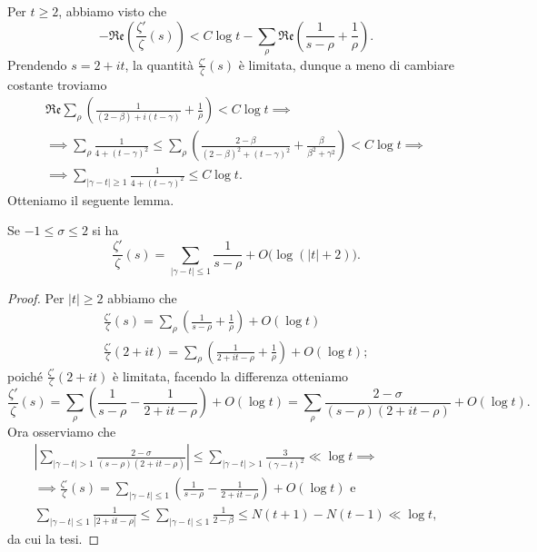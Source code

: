 Per $t \ge 2$, abbiamo visto che
$$-\mathfrak{Re}\left(\frac{\zeta'}{\zeta}(s)\right)<C\log{t}-\sum_{\rho} \mathfrak{Re}\left(\frac{1}{s-\rho}+\frac{1}{\rho}\right).$$
Prendendo $s=2+it$, la quantità $\frac{\zeta'}{\zeta}(s)$ è limitata, dunque a meno di cambiare costante troviamo
\begin{gather*}
  \mathfrak{Re}\sum_{\rho}\left(\frac{1}{(2-\beta)+i(t-\gamma)}+\frac{1}{\rho}\right)<C\log{t} \implies \\
  \implies \sum_{\rho} \frac{1}{4+(t-\gamma)^2} \le \sum_{\rho} \left(\frac{2-\beta}{(2-\beta)^2+(t-\gamma)^2}+\frac{\beta}{\beta^2+\gamma^2}\right)<C\log{t} \implies \\
  \implies \sum_{|\gamma-t| \ge 1} \frac{1}{4+(t-\gamma)^2} \le C\log{t}.
\end{gather*}
Otteniamo il seguente lemma.

\begin{lm}
  Se $-1 \le \sigma \le 2$ si ha
  $$\frac{\zeta'}{\zeta}(s)=\sum_{|\gamma-t| \le 1} \frac{1}{s-\rho}+O\big(\log(|t|+2)\big).$$
\end{lm}

\begin{proof}
  Per $|t| \ge 2$ abbiamo che
  \begin{gather*}
    \frac{\zeta'}{\zeta}(s)=\sum_{\rho} \left(\frac{1}{s-\rho}+\frac{1}{\rho}\right)+O(\log{t}) \\
    \frac{\zeta'}{\zeta}(2+it)=\sum_{\rho}\left(\frac{1}{2+it-\rho}+\frac{1}{\rho}\right)+O(\log{t});
  \end{gather*}
  poiché $\frac{\zeta'}{\zeta}(2+it)$ è limitata, facendo la differenza otteniamo
  $$\frac{\zeta'}{\zeta}(s)=\sum_{\rho} \left(\frac{1}{s-\rho}-\frac{1}{2+it-\rho}\right)+O(\log{t})=\sum_{\rho} \frac{2-\sigma}{(s-\rho)(2+it-\rho)}+O(\log{t}).$$
  Ora osserviamo che
  \begin{gather*}
    \left| \sum_{|\gamma-t|>1} \frac{2-\sigma}{(s-\rho)(2+it-\rho)}\right| \le \sum_{|\gamma-t|>1} \frac{3}{(\gamma-t)^2} \ll \log{t} \implies \\
    \implies \frac{\zeta'}{\zeta}(s)=\sum_{|\gamma-t| \le 1} \left(\frac{1}{s-\rho}-\frac{1}{2+it-\rho}\right)+O(\log{t}) \text{ e} \\
    \sum_{|\gamma-t| \le 1} \frac{1}{|2+it-\rho|} \le \sum_{|\gamma-t| \le 1} \frac{1}{2-\beta} \le N(t+1)-N(t-1) \ll \log{t},
  \end{gather*}
  da cui la tesi.
\end{proof}
